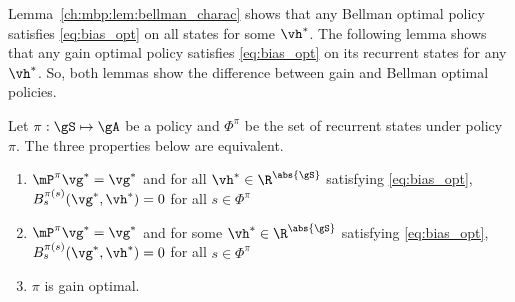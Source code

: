 
Lemma~\ref{ch:mbp:lem:bellman_charac} shows that any Bellman optimal policy satisfies \eqref{eq:bias_opt} on all states for some $\vh^*$.
The following lemma shows that any gain optimal policy satisfies \eqref{eq:bias_opt} on its recurrent states for any $\vh^*$.
So, both lemmas show the difference between gain and Bellman optimal policies.
\begin{lem}
    \label{ch:mbp:lem:opt_pol}
    Let $\pi:\gS\mapsto\gA$ be a policy and $\Phi^\pi$ be the set of recurrent states under policy $\pi$.
    The three properties below are equivalent.
    \begin{enumerate}[label=(\roman*)]
        \item \label{it:opt_pol1} $\mP^\pi\vg^*=\vg^*$ and for all $\vh^*\in \R^{\abs{\gS}}$ satisfying \eqref{eq:bias_opt}, $B^{\pi(s)}_s(\vg^*,\vh^*)=0$ for all $s\in\Phi^\pi$
        \item \label{it:opt_pol2} $\mP^\pi\vg^*=\vg^*$ and for some $\vh^*\in \R^{\abs{\gS}}$ satisfying \eqref{eq:bias_opt}, $B^{\pi(s)}_s(\vg^*,\vh^*)=0$ for all $s\in\Phi^\pi$
        \item \label{it:opt_pol3} $\pi$ is gain optimal.
    \end{enumerate}
\end{lem}
